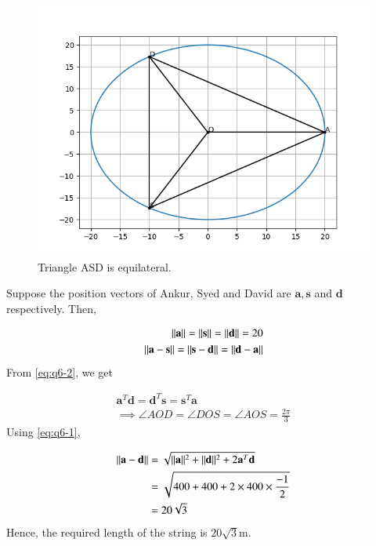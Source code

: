 \documentclass[journal,12pt,twocolumn]{IEEEtran}
\let\vec\mathbf
\begin{document}
\begin{figure}[!ht]
    \centering
    \includegraphics[width=\columnwidth]{figs/10_4_6.png}
    \caption{Triangle ASD is equilateral.}
    \label{fig:q6}
\end{figure}

Suppose the position vectors of Ankur, Syed and David are $\vec{a}, \vec{s}$ 
and $\vec{d}$ respectively. Then,

\begin{align}
    \norm{\vec{a}} = \norm{\vec{s}} = \norm{\vec{d}} = 20 \label{eq:q6-1} \\
    \norm{\vec{a} - \vec{s}} = \norm{\vec{s} - \vec{d}} = \norm{\vec{d} - \vec{a}} \label{eq:q6-2} \\
\end{align}
From \eqref{eq:q6-2}, we get

\begin{align}
    \vec{a}^T\vec{d} = \vec{d}^T\vec{s} = \vec{s}^T\vec{a} \\
    \implies \angle{AOD} = \angle{DOS} = \angle{AOS} = \frac{2\pi}{3}
    \label{eq:q6-3}
\end{align}
Using \eqref{eq:q6-1},

\begin{align}
    \norm{\vec{a} - \vec{d}} &= \sqrt{\norm{\vec{a}}^2 + \norm{\vec{d}}^2 +2\vec{a}^T\vec{d}} \\
    &= \sqrt{400 + 400 + 2\times400\times\frac{-1}{2}} \\
    &= 20\sqrt{3}
    \label{eq:q6-4}
\end{align}
Hence, the required length of the string is $20\sqrt{3}$m.
\end{document}
